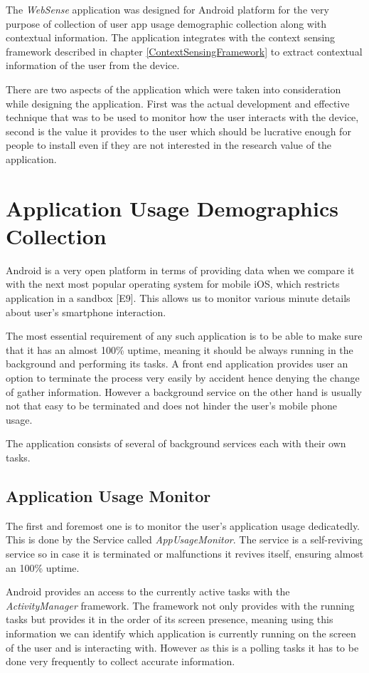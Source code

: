 \documentclass[12pt]{report}
\begin{document}
The \textit{WebSense} application was designed for Android platform for the very purpose of collection of user app usage demographic collection along with contextual information. The application integrates with the context sensing framework described in chapter \ref{ContextSensingFramework} to extract contextual information of the user from the device.

There are two aspects of the application which were taken into consideration while designing the application. First was the actual development and effective technique that was to be used to monitor how the user interacts with the device, second is the value it provides to the user which should be lucrative enough for people to install even if they are not interested in the research value of the application.

\section{Application Usage Demographics Collection}

Android is a very open platform in terms of providing data when we compare it with the next most popular operating system for mobile iOS, which restricts application in a sandbox [E9]. This allows us to monitor various minute details about user's smartphone interaction.

The most essential requirement of any such application is to be able to make sure that it has an almost 100\% uptime, meaning it should be always running in the background and performing its tasks. A front end application provides user an option to terminate the process very easily by accident hence denying the change of gather information. However a background service on the other hand is usually not that easy to be terminated and does not hinder the user's mobile phone usage.

The application consists of several of background services each with their own tasks. 
\subsection{Application Usage Monitor}
The first and foremost one is to monitor the user's application usage dedicatedly. This is done by the Service called \textit{AppUsageMonitor}. The service is a self-reviving service so in case it is terminated or malfunctions it revives itself, ensuring almost an 100\% uptime.

Android provides an access to the currently active tasks with the \textit{ActivityManager} framework. The framework not only provides with the running tasks but provides it in the order of its screen presence, meaning using this information we can identify which application is currently running on the screen of the user and is interacting with. However as this is a polling tasks it has to be done very frequently to collect accurate information.
\end{document}
